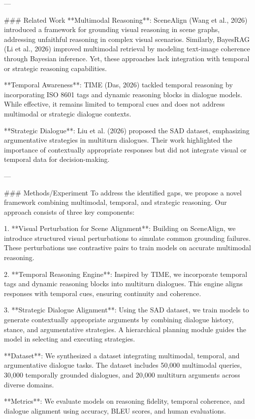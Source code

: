---

### Related Work  
**Multimodal Reasoning**: SceneAlign (Wang et al., 2026) introduced a framework for grounding visual reasoning in scene graphs, addressing unfaithful reasoning in complex visual scenarios. Similarly, BayesRAG (Li et al., 2026) improved multimodal retrieval by modeling text-image coherence through Bayesian inference. Yet, these approaches lack integration with temporal or strategic reasoning capabilities.  

**Temporal Awareness**: TIME (Das, 2026) tackled temporal reasoning by incorporating ISO 8601 tags and dynamic reasoning blocks in dialogue models. While effective, it remains limited to temporal cues and does not address multimodal or strategic dialogue contexts.  

**Strategic Dialogue**: Liu et al. (2026) proposed the SAD dataset, emphasizing argumentative strategies in multiturn dialogues. Their work highlighted the importance of contextually appropriate responses but did not integrate visual or temporal data for decision-making.  

---

### Methods/Experiment  
To address the identified gaps, we propose a novel framework combining multimodal, temporal, and strategic reasoning. Our approach consists of three key components:

1. **Visual Perturbation for Scene Alignment**: Building on SceneAlign, we introduce structured visual perturbations to simulate common grounding failures. These perturbations use contrastive pairs to train models on accurate multimodal reasoning.  

2. **Temporal Reasoning Engine**: Inspired by TIME, we incorporate temporal tags and dynamic reasoning blocks into multiturn dialogues. This engine aligns responses with temporal cues, ensuring continuity and coherence.  

3. **Strategic Dialogue Alignment**: Using the SAD dataset, we train models to generate contextually appropriate arguments by combining dialogue history, stance, and argumentative strategies. A hierarchical planning module guides the model in selecting and executing strategies.  

**Dataset**: We synthesized a dataset integrating multimodal, temporal, and argumentative dialogue tasks. The dataset includes 50,000 multimodal queries, 30,000 temporally grounded dialogues, and 20,000 multiturn arguments across diverse domains.  

**Metrics**: We evaluate models on reasoning fidelity, temporal coherence, and dialogue alignment using accuracy, BLEU scores, and human evaluations.  

